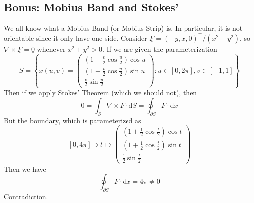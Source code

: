 \subsection{Bonus: Mobius Band and Stokes'}
We all know what a Mobius Band (or Mobius Strip) is.
In particular, it is not orientable since it only have one side.
Consider $\underline{F}=(-y,x,0)^\top/(x^2+y^2)$, so $\nabla\times\underline{F}=\underline{0}$ whenever $x^2+y^2>0$.
If we are given the parameterization
$$S=\left\{\underline{x}(u,v)=\begin{pmatrix}
    (1+\frac{v}{2}\cos\frac{u}{2})\cos u\\
    (1+\frac{v}{2}\cos\frac{u}{2})\sin u\\
    \frac{v}{2}\sin\frac{u}{2}
\end{pmatrix}:u\in[0,2\pi],v\in[-1,1]\right\}$$
Then if we apply Stokes' Theorem (which we should not), then
$$0=\int_S\nabla\times\underline{F}\cdot\mathrm d\underline{S}=\oint_{\partial S}\underline{F}\cdot\mathrm d\underline{x}$$
But the boundary, which is parameterized as
$$[0,4\pi]\ni t\mapsto \begin{pmatrix}
    (1+\frac{1}{2}\cos\frac{t}{2})\cos t\\
    (1+\frac{1}{2}\cos\frac{t}{2})\sin t\\
    \frac{1}{2}\sin\frac{t}{2}
\end{pmatrix}$$
Then we have
$$\oint_{\partial S}\underline{F}\cdot\mathrm d\underline{x}=4\pi\neq 0$$
Contradiction.